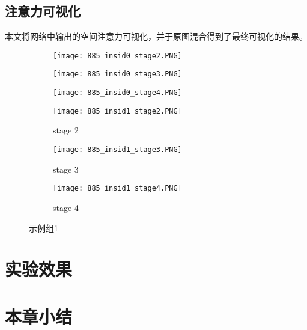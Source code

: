 \subsection{注意力可视化}
\label{sec:weaksuperatten}
本文将网络中输出的空间注意力可视化，并于原图混合得到了最终可视化的结果。
\label{subsec:attenexp}
\begin{figure*}
	\centering
	\begin{minipage}{\textwidth}
		\centering
		\begin{sideways}
			\begin{minipage}{1cm}
			\end{minipage}
		\end{sideways}
		\begin{subfigure}{0.2\linewidth}
		\texttt{[image: 885\_insid0\_stage2.PNG]}
		\end{subfigure}
		\begin{subfigure}{0.2\linewidth}
		\texttt{[image: 885\_insid0\_stage3.PNG]}
		\end{subfigure}
		\begin{subfigure}{0.2\linewidth}
		\texttt{[image: 885\_insid0\_stage4.PNG]}
		\end{subfigure}
	\end{minipage}

	\begin{minipage}{\textwidth}
		\centering
		\begin{sideways}
			\begin{minipage}{1cm}
				\rightline{被遮挡人}
			\end{minipage}
		\end{sideways}
		\begin{subfigure}{0.2\linewidth}
			\texttt{[image: 885\_insid1\_stage2.PNG]}
			\caption{stage 2}
		\end{subfigure}
		\begin{subfigure}{0.2\linewidth}
			\texttt{[image: 885\_insid1\_stage3.PNG]}
			\caption{stage 3}
		\end{subfigure}
		\begin{subfigure}{0.2\linewidth}
			\texttt{[image: 885\_insid1\_stage4.PNG]}
			\caption{stage 4}
		\end{subfigure}
	\end{minipage}
	\label{fig:parallel1}
	\caption{示例组1}
\end{figure*}


\section{实验效果}
\label{sec:demo}

\section{本章小结}